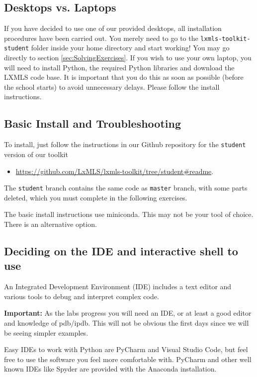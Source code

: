 \subsection{Desktops vs. Laptops}

If you have decided to use one of our provided desktops, all installation procedures have been carried out. You merely need to go to the \verb+lxmls-toolkit-student+ folder inside your home directory and start working! You may go directly to section \ref{sec:SolvingExercises}. If you wish to use your own laptop, you will need to install Python, the required Python libraries and download the LXMLS code base. It is important that you do this as soon as possible (before the school starts) to avoid unnecessary delays. Please follow the install instructions. 

\subsection{Basic Install and Troubleshooting}

To install, just follow the instructions in our Github repository for the \verb+student+ version of our toolkit 

\begin{itemize}
\item \url{https://github.com/LxMLS/lxmls-toolkit/tree/student#readme}. 
\end{itemize}

The \verb+student+ branch contains the same code as \verb+master+ branch, with some parts deleted, which you must complete in the following exercises. 

The basic install instructions use miniconda. This may not be your tool of choice. There is an alternative option.

\subsection{Deciding on the IDE and interactive shell to use}

An Integrated Development Environment (IDE) includes a text editor and various tools to debug and interpret complex code. 

\textbf{Important:} As the labs progress you will need an IDE, or at least a good editor and knowledge of pdb/ipdb. This will not be obvious the first days since we will be seeing simpler examples.

Easy IDEs to work with Python are PyCharm and Visual Studio Code, but feel free to use the software you feel more comfortable with. PyCharm and other well known IDEs like Spyder are provided with the Anaconda installation.

